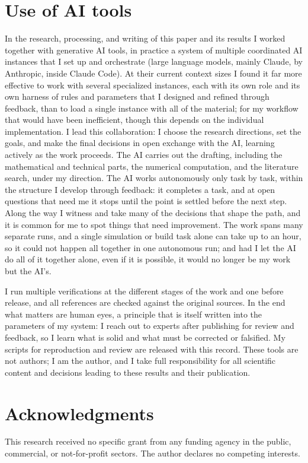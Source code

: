 \documentclass[aps,pra,reprint,superscriptaddress,nofootinbib]{revtex4-2}
\begin{document}
\section*{Use of AI tools}
In the research, processing, and writing of this paper and its results I worked together with generative AI tools, in practice a system of multiple coordinated AI instances that I set up and orchestrate (large language models, mainly Claude, by Anthropic, inside Claude Code). At their current context sizes I found it far more effective to work with several specialized instances, each with its own role and its own harness of rules and parameters that I designed and refined through feedback, than to load a single instance with all of the material; for my workflow that would have been inefficient, though this depends on the individual implementation. I lead this collaboration: I choose the research directions, set the goals, and make the final decisions in open exchange with the AI, learning actively as the work proceeds. The AI carries out the drafting, including the mathematical and technical parts, the numerical computation, and the literature search, under my direction. The AI works autonomously only task by task, within the structure I develop through feedback: it completes a task, and at open questions that need me it stops until the point is settled before the next step. Along the way I witness and take many of the decisions that shape the path, and it is common for me to spot things that need improvement. The work spans many separate runs, and a single simulation or build task alone can take up to an hour, so it could not happen all together in one autonomous run; and had I let the AI do all of it together alone, even if it is possible, it would no longer be my work but the AI's.

I run multiple verifications at the different stages of the work and one before release, and all references are checked against the original sources. In the end what matters are human eyes, a principle that is itself written into the parameters of my system: I reach out to experts after publishing for review and feedback, so I learn what is solid and what must be corrected or falsified. My scripts for reproduction and review are released with this record. These tools are not authors; I am the author, and I take full responsibility for all scientific content and decisions leading to these results and their publication.

\section*{Acknowledgments}
This research received no specific grant from any funding agency in the public,
commercial, or not-for-profit sectors. The author declares no competing
interests.


\end{document}
